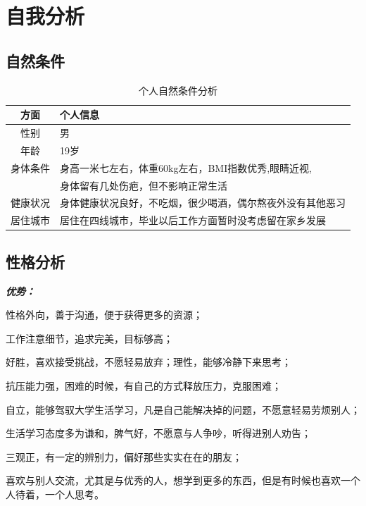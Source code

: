 \documentclass{article}
\begin{document}
\thispagestyle{empty}
\newpage
\setcounter{page}{1}
\section{自我分析}
\subsection{自然条件}


\begin{table}[h]
	\centering
	\caption{个人自然条件分析}
	\begin{tabular}{cl}
		\hline
		方面 & 个人信息 \\
		\hline
		性别 & 男 \\ 
		年龄 & 19岁 \\
		身体条件 & 身高一米七左右，体重60kg左右，BMI指数优秀,眼睛近视,\\
		        &  身体留有几处伤疤，但不影响正常生活\\
		健康状况 & 身体健康状况良好，不吃烟，很少喝酒，偶尔熬夜外没有其他恶习\\
		居住城市 & 居住在四线城市，毕业以后工作方面暂时没考虑留在家乡发展\\
		\hline
	\end{tabular}
	\label{table1}
\end{table}


\subsection{性格分析}
\textbf{\textit{优势：}}\par 
性格外向，善于沟通，便于获得更多的资源；\par
工作注意细节，追求完美，目标够高；\par
好胜，喜欢接受挑战，不愿轻易放弃；理性，能够冷静下来思考；\par
抗压能力强，困难的时候，有自己的方式释放压力，克服困难；\par
自立，能够驾驭大学生活学习，凡是自己能解决掉的问题，不愿意轻易劳烦别人；\par
生活学习态度多为谦和，脾气好，不愿意与人争吵，听得进别人劝告；\par
三观正，有一定的辨别力，偏好那些实实在在的朋友；\par
喜欢与别人交流，尤其是与优秀的人，想学到更多的东西，但是有时候也喜欢一个人待着，一个人思考。\par
 
\end{document}
